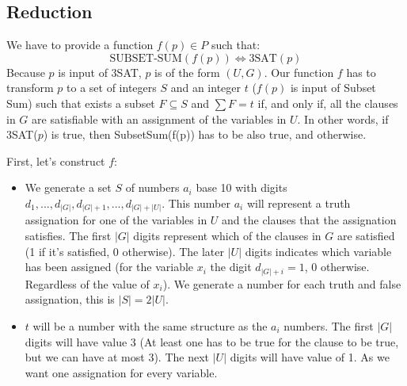 \subsection{Reduction}
We have to provide a function $f(p) \in P$ such that:
\[
\text{SUBSET-SUM}(f(p)) \iff \text{3SAT}(p)
\]
Because $p$ is input of 3SAT, $p$ is of the form $(U, G)$. Our function $f$ has to transform $p$ to a set of integers $S$ and an integer $t$ ($f(p)$ is input of Subset Sum) such that exists a subset $F \subseteq S$ and $\sum F=t$ if, and only if, all the clauses in $G$ are satisfiable with an assignment of the variables in $U$. In other words, if 3SAT($p$) is true, then SubsetSum(f(p)) has to be also true, and otherwise.

First, let's construct $f$:
\newline
\begin{itemize}
    \item We generate a set $S$ of numbers $a_i$ base 10 with digits $d_1,..., d_{|G|},d_{|G|+1},...,d_{|G|+|U|}$. This number $a_i$ will represent a truth assignation for one of the variables in $U$ and the clauses that the assignation satisfies. The first $|G|$ digits represent which of the clauses in $G$ are satisfied (1 if it's satisfied, 0 otherwise). The later $|U|$ digits indicates which variable has been assigned (for the variable $x_i$ the digit $d_{|G|+i}=1$, 0 otherwise. Regardless of the value of $x_i$). We generate a number for each truth and false assignation, this is $|S|=2|U|$.
    \item $t$ will be a number with the same structure as the $a_i$ numbers. The first $|G|$ digits will have value 3 (At least one has to be true for the clause to be true, but we can have at most 3). The next $|U|$ digits will have value of 1. As we want one assignation for every variable.
\end{itemize}


